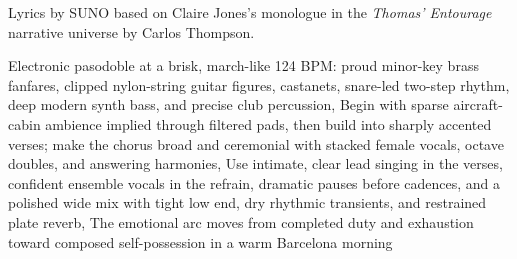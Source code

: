
\begin{notes}
Lyrics by SUNO based on Claire Jones's monologue in the \emph{Thomas’ Entourage} narrative universe by Carlos Thompson.
\end{notes}
\begin{style}
Electronic pasodoble at a brisk, march-like 124 BPM: proud minor-key brass fanfares, clipped nylon-string guitar figures, castanets, snare-led two-step rhythm, deep modern synth bass, and precise club percussion, Begin with sparse aircraft-cabin ambience implied through filtered pads, then build into sharply accented verses; make the chorus broad and ceremonial with stacked female vocals, octave doubles, and answering harmonies, Use intimate, clear lead singing in the verses, confident ensemble vocals in the refrain, dramatic pauses before cadences, and a polished wide mix with tight low end, dry rhythmic transients, and restrained plate reverb, The emotional arc moves from completed duty and exhaustion toward composed self-possession in a warm Barcelona morning
\end{style}
